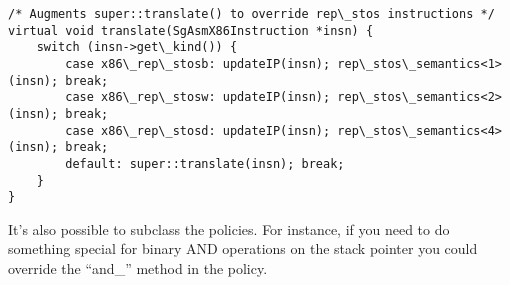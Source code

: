 \begin{verbatim}
/* Augments super::translate() to override rep\_stos instructions */
virtual void translate(SgAsmX86Instruction *insn) {
    switch (insn->get\_kind()) {
        case x86\_rep\_stosb: updateIP(insn); rep\_stos\_semantics<1>(insn); break;
        case x86\_rep\_stosw: updateIP(insn); rep\_stos\_semantics<2>(insn); break;
        case x86\_rep\_stosd: updateIP(insn); rep\_stos\_semantics<4>(insn); break;
        default: super::translate(insn); break;
    }
}
\end{verbatim}

It's also possible to subclass the policies. For instance, if you need
to do something special for binary AND operations on the stack
pointer you could override the ``and\_'' method in the policy.
